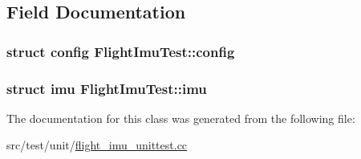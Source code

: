 \subsection{Field Documentation}
\hypertarget{classFlightImuTest_a6ec44e9a322dd6071225aece690c64b6}{
\subsubsection[{config}]{\setlength{\rightskip}{0pt plus 5cm}struct {\bf config} Flight\+Imu\+Test\+::config\hspace{0.3cm}{\ttfamily [protected]}}}\label{classFlightImuTest_a6ec44e9a322dd6071225aece690c64b6}
\hypertarget{classFlightImuTest_a0548654e0c452a7e421ed11da4cb5510}{
\subsubsection[{imu}]{\setlength{\rightskip}{0pt plus 5cm}struct {\bf imu} Flight\+Imu\+Test\+::imu\hspace{0.3cm}{\ttfamily [protected]}}}\label{classFlightImuTest_a0548654e0c452a7e421ed11da4cb5510}


The documentation for this class was generated from the following file\+:\begin{DoxyCompactItemize}
\item 
src/test/unit/\hyperlink{flight__imu__unittest_8cc}{flight\+\_\+imu\+\_\+unittest.\+cc}\end{DoxyCompactItemize}
